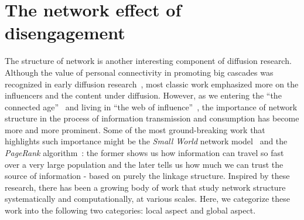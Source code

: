\documentclass[phd,tocprelim]{cornell}
\begin{document}
\section{The network effect of disengagement}
The structure of network is another interesting component of diffusion research. 
Although the value of personal connectivity in promoting big cascades was recognized in early diffusion research~\cite{Rogers:2003,katz_lazarsfeld,katz_57}, most classic work emphasized more on the influencers and the content under diffusion. However, as we entering the ``the connected age''~\cite{Watts-2004} and living in ``the web of influence''~\cite{christakis-2011},  the importance of network structure 
in the process of information transmission and consumption has become more and more prominent. 
Some of the most ground-breaking work that highlights such importance might be the \emph{Small World} network model~\cite{Watts-1998} and the \emph{PageRank} algorithm~\cite{Brin:1998}: the former shows us how information can travel so fast over a very large population and the later tells us how much we can trust the source of information - based on purely the linkage structure. Inspired by these research, there has been a growing body of work that study network structure systematically and computationally, at various scales. Here, we categorize these work into the following two categories: local aspect and global aspect.
\end{document}
